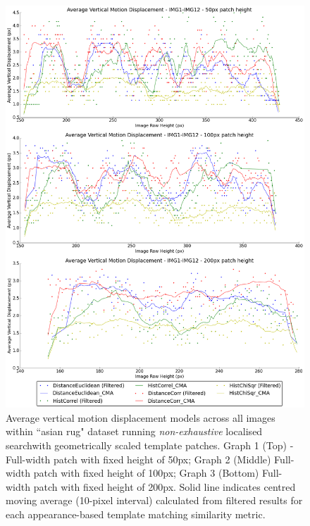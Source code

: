 \begin{figure}[ht!]
\centering
\includegraphics[scale=0.3]{images/results/wiltshire_inside_10cm_scaled}
\caption{Average vertical motion displacement models across all images within ``asian rug" dataset running \textit{non-exhaustive} localised searchwith geometrically scaled template patches. Graph 1 (Top) - Full-width patch with fixed height of 50px; Graph 2 (Middle) Full-width patch with fixed height of 100px; Graph 3 (Bottom) Full-width patch with fixed height of 200px. Solid line indicates centred moving average (10-pixel interval) calculated from filtered results for each appearance-based template matching similarity metric.}
\label{fig:ex3_3_1}
\end{figure}

